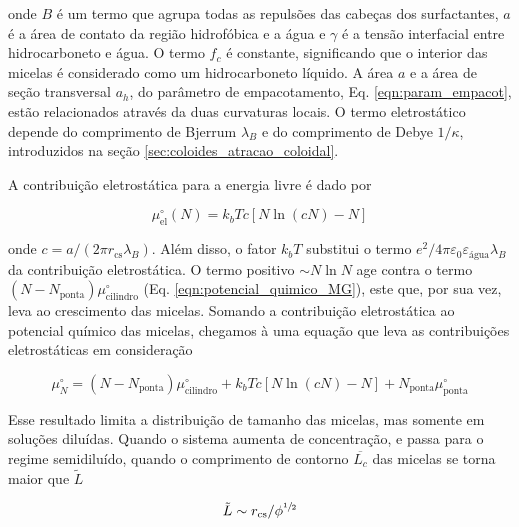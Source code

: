 		\noindent onde \(B\) é um termo que agrupa todas as repulsões das cabeças dos surfactantes, \(a\) é a área de contato da região hidrofóbica e a água e \(\gamma\) é a tensão interfacial entre hidrocarboneto e água. O termo \(f_c\) é constante, significando que o interior das micelas é considerado como um hidrocarboneto líquido. A área \(a\) e a área de seção transversal \(a_h\), do parâmetro de empacotamento, Eq. \ref{eqn:param_empacot}, estão relacionados através da duas curvaturas locais. O termo eletrostático depende do comprimento de Bjerrum \(\lambda_B\) e do comprimento de Debye \(1/\kappa\), introduzidos na seção \ref{sec:coloides_atracao_coloidal}.
		
		A contribuição eletrostática para a energia livre é dado por
		
		\begin{equation}
			\mu_\mathrm{el}^\circ (N) = k_b T c \left[ N \ln (cN) - N \right]
			\label{eqn:potencial_quim_eletrostatico}
		\end{equation} 
		
		\noindent onde \(c = a / (2 \pi r_\mathrm{cs} \lambda_B)\). Além disso, o fator \(k_bT\) substitui o termo \(e^2/4\pi\varepsilon_{ 0 }\varepsilon_\mathrm{água}\lambda_B\) da contribuição eletrostática. O termo positivo \(\sim N \ln N\) age contra o termo \((N - N_\mathrm{ponta}) \mu_\mathrm{cilindro}^\circ\) (Eq. \ref{eqn:potencial_quimico_MG}), este que, por sua vez, leva ao crescimento das micelas. Somando a contribuição eletrostática ao potencial químico das micelas, chegamos à uma equação que leva as contribuições eletrostáticas em consideração
		
		\begin{equation}
			\mu_N^\circ = (N - N_\mathrm{ponta})\mu_\mathrm{cilindro}^\circ + k_b T c \left[ N \ln (cN) - N \right] + N_\mathrm{ponta}\mu_\mathrm{ponta}^\circ
		\end{equation}
		
		Esse resultado limita a distribuição de tamanho das micelas, mas somente em soluções diluídas. Quando o sistema aumenta de concentração, e passa para o regime semidiluído, quando o comprimento de contorno \(\overline{L_c}\) das micelas se torna maior que \(\tilde{L}\) 
		
		\begin{equation}
		 	\tilde{L} \sim r_\mathrm{cs} / \phi^{\sfrac{1}{2}}
		\end{equation}
		
